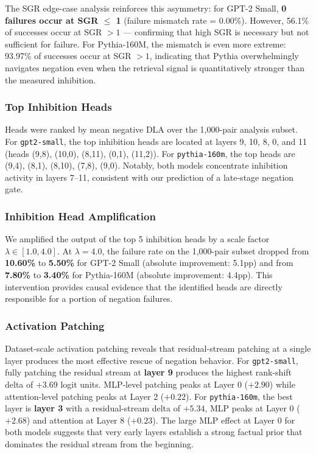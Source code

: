 \documentclass[11pt]{article}
\begin{document}
The SGR edge-case analysis reinforces this asymmetry: for GPT-2 Small, \textbf{0 failures occur at SGR $\leq$ 1} (failure mismatch rate = 0.00\%). However, 56.1\% of successes occur at SGR $> 1$ — confirming that high SGR is necessary but not sufficient for failure. For Pythia-160M, the mismatch is even more extreme: 93.97\% of successes occur at SGR $> 1$, indicating that Pythia overwhelmingly navigates negation even when the retrieval signal is quantitatively stronger than the measured inhibition.

\subsubsection{Top Inhibition Heads}
Heads were ranked by mean negative DLA over the 1,000-pair analysis subset. For \texttt{gpt2-small}, the top inhibition heads are located at layers 9, 10, 8, 0, and 11 (heads (9,8), (10,0), (8,11), (0,1), (11,2)). For \texttt{pythia-160m}, the top heads are (9,4), (8,1), (8,10), (7,8), (9,0). Notably, both models concentrate inhibition activity in layers 7--11, consistent with our prediction of a late-stage negation gate.

\subsubsection{Inhibition Head Amplification}
We amplified the output of the top 5 inhibition heads by a scale factor $\lambda \in [1.0, 4.0]$. At $\lambda = 4.0$, the failure rate on the 1,000-pair subset dropped from \textbf{10.60\%} to \textbf{5.50\%} for GPT-2 Small (absolute improvement: 5.1pp) and from \textbf{7.80\%} to \textbf{3.40\%} for Pythia-160M (absolute improvement: 4.4pp). This intervention provides causal evidence that the identified heads are directly responsible for a portion of negation failures.
\subsubsection{Activation Patching}
Dataset-scale activation patching reveals that residual-stream patching at a single layer produces the most effective rescue of negation behavior. For \texttt{gpt2-small}, fully patching the residual stream at \textbf{layer 9} produces the highest rank-shift delta of $+3.69$ logit units. MLP-level patching peaks at Layer 0 ($+2.90$) while attention-level patching peaks at Layer 2 ($+0.22$). For \texttt{pythia-160m}, the best layer is \textbf{layer 3} with a residual-stream delta of $+5.34$, MLP peaks at Layer 0 ($+2.68$) and attention at Layer 8 ($+0.23$). The large MLP effect at Layer 0 for both models suggests that very early layers establish a strong factual prior that dominates the residual stream from the beginning.
\end{document}
